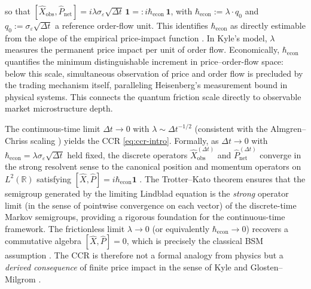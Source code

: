 so that $[\hat{X}_{\mathrm{obs}},\hat{P}_{\mathrm{net}}]
= i\lambda\sigma_\varepsilon\sqrt{\Delta t}\,\mathbf{1}
=: i\hbar_{\mathrm{econ}}\,\mathbf{1}$,
with $\hbar_{\mathrm{econ}} := \lambda \cdot q_0$ and
$q_0 := \sigma_\varepsilon\sqrt{\Delta t}$ a reference order-flow unit.
This identifies $\hbar_{\mathrm{econ}}$ as directly estimable from the slope
of the empirical price-impact function
\citep{almgren2005direct,toth2011anomalous}.
In Kyle's model, $\lambda$ measures the permanent price impact per unit of
order flow. Economically, $\hbar_{\mathrm{econ}}$ quantifies the minimum
distinguishable increment in price--order-flow space: below this scale,
simultaneous observation of price and order flow is precluded by the trading
mechanism itself, paralleling Heisenberg's measurement bound in physical
systems. This connects the quantum friction scale directly to observable
market microstructure depth.

The continuous-time limit $\Delta t \to 0$ with $\lambda \sim \Delta t^{-1/2}$
(consistent with the Almgren--Chriss scaling \citep{almgren2005direct}) yields the
CCR \eqref{eq:ccr-intro}. Formally, as $\Delta t \to 0$ with
$\hbar_{\mathrm{econ}} = \lambda \sigma_\varepsilon \sqrt{\Delta t}$ held fixed,
the discrete operators $\hat{X}_{\mathrm{obs}}^{(\Delta t)}$ and
$\hat{P}_{\mathrm{net}}^{(\Delta t)}$ converge in the strong resolvent sense
to the canonical position and momentum operators on $L^2(\mathbb{R})$ satisfying
$[\hat{X}, \hat{P}] = i\hbar_{\mathrm{econ}}\mathbf{1}$ \citep{reed1972methods}.
The Trotter--Kato theorem \citep{kato1978trotter} ensures that the semigroup
generated by the limiting Lindblad equation is the \emph{strong} operator limit
(in the sense of pointwise convergence on each vector) of the
discrete-time Markov semigroups, providing a rigorous foundation for the
continuous-time framework. The frictionless limit $\lambda \to 0$ (or equivalently
$\hbar_{\mathrm{econ}} \to 0$) recovers a commutative algebra
$[\hat{X}, \hat{P}] = 0$, which is precisely the classical BSM assumption
\citep{black1973pricing,merton1973theory}. The CCR is therefore not a formal
analogy from physics but a \emph{derived consequence} of finite price impact in the
sense of Kyle \citep{kyle1985continuous} and Glosten--Milgrom \citep{glosten1985bid}.

